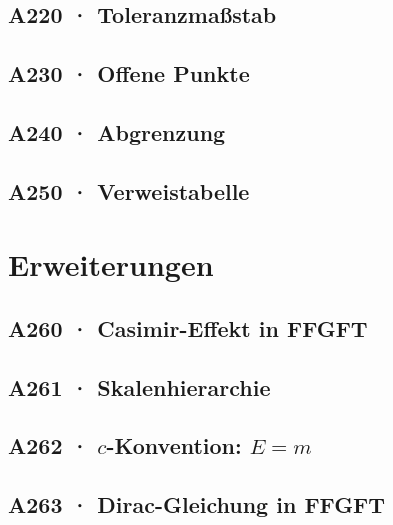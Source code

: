 \documentclass[11pt,twoside,openright]{book}
\begin{document}
\chapter[A220 · Toleranzmaßstab]{A220 · Toleranzmaßstab}


\chapter[A230 · Offene Punkte]{A230 · Offene Punkte}


\chapter[A240 · Abgrenzung]{A240 · Abgrenzung}


\chapter[A250 · Verweistabelle]{A250 · Verweistabelle}


\part{Erweiterungen}

\chapter[A260 · Casimir-Effekt]{A260 · Casimir-Effekt in FFGFT}


\chapter[A261 · Skalenhierarchie]{A261 · Skalenhierarchie}


\chapter[A262 · $c$-Konvention]{A262 · $c$-Konvention: $E=m$}


\chapter[A263 · Dirac-Gleichung]{A263 · Dirac-Gleichung in FFGFT}

\end{document}
